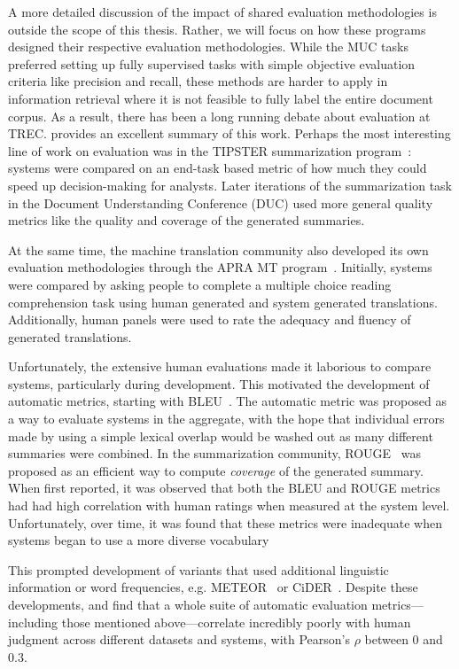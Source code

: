A more detailed discussion of the impact of shared evaluation methodologies is outside the scope of this thesis.
Rather, we will focus on how these programs designed their respective evaluation methodologies.
While the MUC tasks preferred setting up fully supervised tasks with simple objective evaluation criteria like precision and recall, these methods are harder to apply in information retrieval where it is not feasible to fully label the entire document corpus.
As a result, there has been a long running debate about evaluation at TREC.\@
\citet{webber2010measurement} provides an excellent summary of this work.
Perhaps the most interesting line of work on evaluation was in the TIPSTER summarization program~\citep{mani1999tipster}:
  systems were compared on an end-task based metric of how much they could speed up decision-making for analysts.
Later iterations of the summarization task in the Document Understanding Conference (DUC) used more general quality metrics like the quality and coverage of the generated summaries.

At the same time, the machine translation community also developed its own evaluation methodologies through the APRA MT program~\citep{white1994arpa}.
Initially, systems were compared by asking people to complete a multiple choice reading comprehension task using human generated and system generated translations.
Additionally, human panels were used to rate the adequacy and fluency of generated translations.

Unfortunately, the extensive human evaluations made it laborious to compare systems, particularly during development.
This motivated the development of automatic metrics, starting with BLEU~\citep{papineni02bleu}.
The automatic metric was proposed as a way to evaluate systems in the aggregate, with the hope that individual errors made by using a simple lexical overlap would be washed out as many different summaries were combined.
In the summarization community, ROUGE~\citep{lin2004rouge} was proposed as an efficient way to compute \textit{coverage} of the generated summary.
When first reported, it was observed that both the BLEU and ROUGE metrics had had high correlation with human ratings when measured at the system level.
Unfortunately, over time, it was found that these metrics were inadequate when systems began to use a more diverse vocabulary~\citep{lavie2009meteor,cohan2016revisiting}

This prompted development of variants that used additional linguistic information or word frequencies, e.g. METEOR~\citep{lavie2009meteor,denkowski2014meteor} or CiDER~\citep{vedantam2015cider}.
Despite these developments, \citet{liu2016evaluate} and \citet{novikova2017why} find that a whole suite of automatic evaluation metrics---including those mentioned above---correlate incredibly poorly with human judgment across different datasets and systems, with Pearson's $\rho$ between $0$ and $0.3$.

